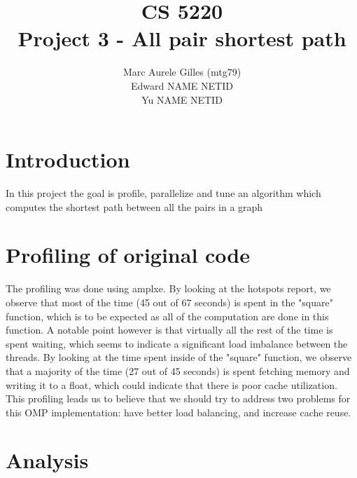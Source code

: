 \documentclass[11pt]{article}
\begin{document}
\title{CS 5220\\ Project 3 - All pair shortest path}
\author{Marc Aurele Gilles (mtg79)\\ Edward NAME NETID \\ Yu NAME NETID}
\maketitle

\section{Introduction}
In this project the goal is profile, parallelize and tune an algorithm which computes the shortest path between all the pairs in a graph


\section{Profiling of original code}
The profiling was done using amplxe. By looking at the hotspots report, we observe that most of the time (45 out of 67 seconds) is spent in the "square" function, which is to be expected as all of the computation are done in this function. A notable point however is that virtually all the rest of the time is spent waiting, which seems to indicate a significant load imbalance between the threads.
By looking at the time spent inside of the "square" function, we observe that a majority of the time (27 out of 45 seconds) is spent fetching memory and writing it to a float, which could indicate that there is poor cache utilization.
\\
This profiling leads us to believe that we should try to address two problems for this OMP implementation: have better load balancing, and increase cache reuse.


 

\section{Analysis}




\begin{thebibliography}{9}


\end{thebibliography}

 
 
\end{document}
